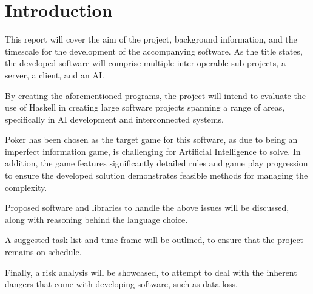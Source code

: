\section{Introduction}
This report will cover the aim of the project, background information, and the timescale for the development of the accompanying software.
As the title states, the developed software will comprise multiple inter operable sub projects, a server, a client, and an AI\@.

By creating the aforementioned programs, the project will intend to evaluate the use of Haskell\cite{hudak1992} in creating large software projects spanning a range of areas, specifically in AI development and interconnected systems.

Poker has been chosen as the target game for this software, as due to being an imperfect information game\cite{sandholm2010}, is challenging for Artificial Intelligence to solve.
In addition, the game features significantly detailed rules and game play progression to ensure the developed solution demonstrates feasible methods for managing the complexity.

Proposed software and libraries to handle the above issues will be discussed, along with reasoning behind the language choice.

A suggested task list and time frame will be outlined, to ensure that the project remains on schedule.

Finally, a risk analysis will be showcased, to attempt to deal with the inherent dangers that come with developing software, such as data loss.
